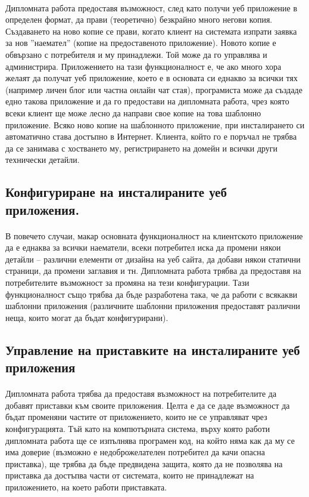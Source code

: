 \documentclass[pdftex,14pt,a4paper]{extreport}
\begin{document}
\paragraph {}
Дипломната работа предоставя възможност, след като получи уеб приложение в определен формат, да прави (теоретично) безкрайно много негови копия. Създаването на ново копие се прави, когато клиент на системата изпрати заявка за нов ''наемател'' (копие на предоставеното приложение). Новото копие е обвързано с потребителя и му принадлежи. Той може да го управлява и администрира. Приложението на тази функционалност е, че ако много хора желаят да получат уеб приложение, което е в основата си еднакво за всички тях (например личен блог или частна онлайн чат стая), програмиста може да създаде едно такова приложение и да го предостави на дипломната работа, чрез която всеки клиент ще може лесно да направи свое копие на това шаблонно приложение. Всяко ново копие на шаблонното приложение, при инсталирането си автоматично става достъпно в Интернет. Клиента, който го е поръчал не трябва да се занимава с хостването му, регистрирането на домейн и всички други технически детайли.
\subsection {Конфигуриране на инсталираните уеб приложения.}
\paragraph {}
В повечето случаи, макар основната функционалност на клиентското приложение да е еднаква за всички наематели, всеки потребител иска да промени някои детайли – различни елементи от дизайна на уеб сайта, да добави някои статични страници, да промени заглавия и тн. Дипломната работа трябва да предоставя на потребителите възможност за промяна на тези конфигурации. Тази функционалност също трябва да бъде разработена така, че да работи с всякакви шаблонни приложения (различните шаблонни приложения предоставят различни неща, които могат да бъдат конфигурирани).
\subsection {Управление на приставките на инсталираните уеб приложения}
\paragraph {}
Дипломната работа трябва да предоставя възможност на потребителите да добавят приставки към своите приложения. Целта е да се даде възможност да бъдат променяни частите от приложението, които не се управляват чрез конфигурацията. Тъй като на компютърната система, върху която работи дипломната работа ще се изпълнява програмен код, на който няма как да му се има доверие (възможно е недоброжелателен потребител да качи опасна приставка), ще трябва да бъде предвидена защита, която да не позволява на приставка да достъпва части от системата, които не принадлежат на приложението, на което работи приставката.
\end{document}
